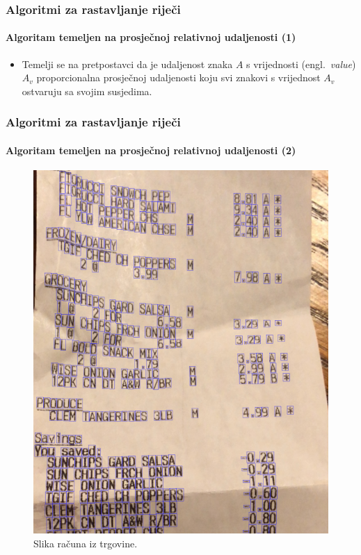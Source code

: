 \documentclass{beamer}
\newcommand{\engl}[1]{(engl.~\emph{#1})}
\begin{document}
\begin{frame}
\frametitle{Algoritmi za rastavljanje riječi}
\framesubtitle{Algoritam temeljen na prosječnoj relativnoj udaljenosti (1)}
\begin{itemize}
    \item Temelji se na pretpostavci da je udaljenost znaka $A$ s vrijednosti
          \engl{value} $A_v$ proporcionalna prosječnoj udaljenosti koju svi
          znakovi s vrijednost $A_v$ ostvaruju sa svojim susjedima.
\end{itemize}
\end{frame}
\begin{frame}
\frametitle{Algoritmi za rastavljanje riječi}
\framesubtitle{Algoritam temeljen na prosječnoj relativnoj udaljenosti (2)}
\begin{figure}[htb]
    \centering
    \includegraphics[height=.73\textheight]{images/receipt-example-03.png}
    \caption{Slika računa iz trgovine.}
    \label{fig:receipt-example-03}
\end{figure}
\end{frame}
\end{document}
